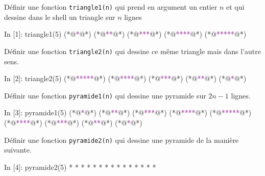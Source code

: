 \documentclass{magnolia}
\begin{document}
\begin{questions}
\question Définir une fonction \verb!triangle1(n)! qui prend en argument un entier $n$
  et qui dessine dans le shell un triangle sur $n$ lignes
\begin{pythoncode}
In [1]: triangle1(5)
(*@\textcolor{purple}{*}@*)
(*@\textcolor{purple}{**}@*)
(*@\textcolor{purple}{***}@*)
(*@\textcolor{purple}{****}@*)
(*@\textcolor{purple}{*****}@*)
\end{pythoncode}
\question Définir une fonction \verb!triangle2(n)! qui dessine ce même triangle mais dans
  l'autre sens.
\begin{pythoncode}
In [2]: triangle2(5)
(*@\textcolor{purple}{*****}@*)
(*@\textcolor{purple}{****}@*)
(*@\textcolor{purple}{***}@*)
(*@\textcolor{purple}{**}@*)
(*@\textcolor{purple}{*}@*)
\end{pythoncode}
\question Définir une fonction \verb!pyramide1(n)! qui dessine une pyramide sur $2n-1$ lignes.
\begin{pythoncode}
In [3]: pyramide1(5)
(*@\textcolor{purple}{*}@*)
(*@\textcolor{purple}{**}@*)
(*@\textcolor{purple}{***}@*)
(*@\textcolor{purple}{****}@*)
(*@\textcolor{purple}{*****}@*)
(*@\textcolor{purple}{****}@*)
(*@\textcolor{purple}{***}@*)
(*@\textcolor{purple}{**}@*)
(*@\textcolor{purple}{*}@*)
\end{pythoncode}
\question Définir une fonction \verb!pyramide2(n)! qui dessine une pyramide de la manière
  suivante.
\begin{pythoncode}
In [4]: pyramide2(5)
    *
   * *
  * * *
 * * * *
* * * * *
\end{pythoncode}
\end{questions}

\end{document}
